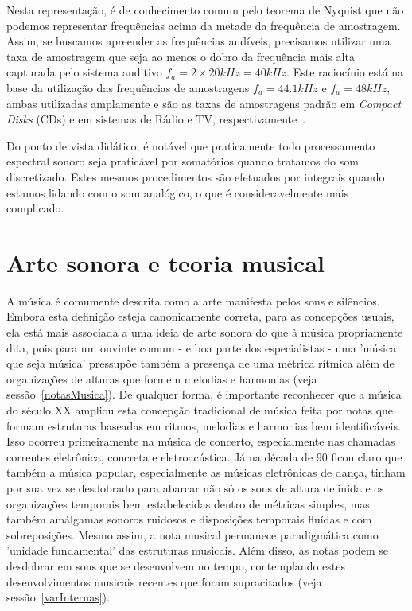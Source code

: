 Nesta representação, é de conhecimento comum pelo teorema de Nyquist que não podemos representar frequências acima da metade da frequência de amostragem. Assim, se buscamos apreender as frequências audíveis, precisamos utilizar uma taxa de amostragem que seja ao menos o dobro da frequência mais alta capturada pelo sistema auditivo $f_a=2\times 20kHz=40kHz$. Este raciocínio está na base da utilização das frequências de amostragens $f_a=44.1kHz$ e $f_a=48kHz$, ambas utilizadas amplamente e são as taxas de amostragens padrão em \emph{Compact Disks} (CDs) e em sistemas de Rádio e TV, respectivamente~\cite{protocolosAudio}.

Do ponto de vista didático, é notável que praticamente todo processamento espectral sonoro seja praticável por somatórios quando tratamos do som discretizado. Estes mesmos procedimentos são efetuados por integrais quando estamos lidando com o som analógico, o que é consideravelmente mais complicado.




    \section{Arte sonora e teoria musical}

A música é comumente descrita como a arte manifesta pelos sons e silêncios. Embora esta definição esteja canonicamente correta, para as concepções usuais, ela está mais associada a uma ideia de arte sonora do que à música propriamente dita, pois para um ouvinte comum - e boa parte dos especialistas - uma 'música que seja música' pressupõe também a presença de uma métrica rítmica além de organizações de alturas que formem melodias e harmonias (veja sessão~\ref{notasMusica}). De qualquer forma, é importante reconhecer que a música do século XX ampliou esta concepção tradicional de música feita por notas que formam estruturas baseadas em ritmos, melodias e harmonias bem identificáveis. Isso ocorreu primeiramente na música de concerto, especialmente nas chamadas correntes eletrônica, concreta e eletroacústica. Já na década de 90 ficou claro que também a música popular, especialmente as músicas eletrônicas de dança, tinham por sua vez se desdobrado para abarcar não só os sons de altura definida e os organizações temporais bem estabelecidas dentro de métricas simples, mas também amálgamas sonoros ruidosos e disposições temporais fluídas e com sobreposições. Mesmo assim, a nota musical permanece paradigmática como 'unidade fundamental' das estruturas musicais. Além disso, as notas podem se desdobrar em sons que se desenvolvem no tempo, contemplando estes desenvolvimentos musicais recentes que foram supracitados (veja sessão~\ref{varInternas}).~\cite{Wisnick,Webern,Lerdahl,Cook}

